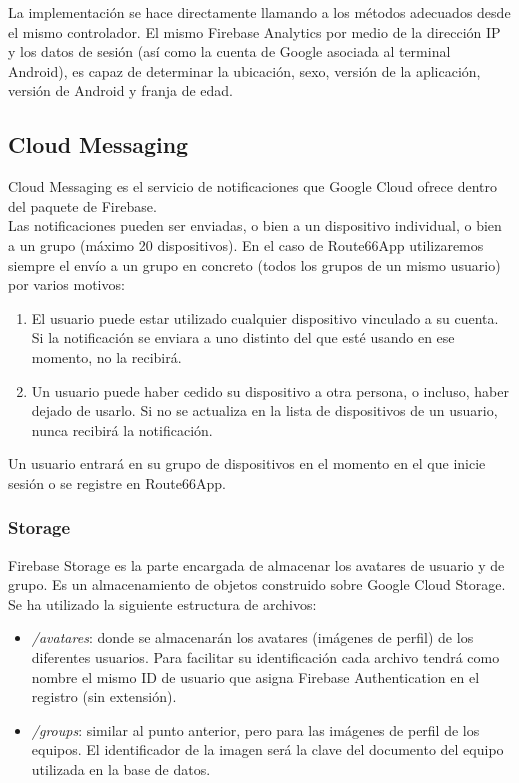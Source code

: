 \documentclass[twoside]{report}
\begin{document}
La implementación se hace directamente llamando a los métodos adecuados desde el mismo controlador. El mismo Firebase Analytics por medio de la dirección IP y los datos de sesión (así como la cuenta de Google asociada al terminal Android), es capaz de determinar la ubicación, sexo, versión de la aplicación, versión de Android y franja de edad.

\subsection{Cloud Messaging}

Cloud Messaging es el servicio de notificaciones que Google Cloud ofrece dentro del paquete de Firebase. \\

Las notificaciones pueden ser enviadas, o bien a un dispositivo individual, o bien a un grupo (máximo 20 dispositivos). En el caso de Route66App utilizaremos siempre el envío a un grupo en concreto (todos los grupos de un mismo usuario) por varios motivos:

\begin{enumerate}
\item El usuario puede estar utilizado cualquier dispositivo vinculado a su cuenta. Si la notificación se enviara a uno distinto del que esté usando en ese momento, no la recibirá.

\item Un usuario puede haber cedido su dispositivo a otra persona, o incluso, haber dejado de usarlo. Si no se actualiza en la lista de dispositivos de un usuario, nunca recibirá la notificación.
\end{enumerate}

Un usuario entrará en su grupo de dispositivos en el momento en el que inicie sesión o se registre en Route66App.


\subsubsection{Storage}

Firebase Storage es la parte encargada de almacenar los avatares de usuario y de grupo. Es un almacenamiento de objetos construido sobre Google Cloud Storage. \\

Se ha utilizado la siguiente estructura de archivos:
\begin{itemize}
\item \textit{/avatares}: donde se almacenarán los avatares (imágenes de perfil) de los diferentes usuarios. Para facilitar su identificación cada archivo tendrá como nombre el mismo ID de usuario que asigna Firebase Authentication en el registro (sin extensión). 
\item \textit{/groups}: similar al punto anterior, pero para las imágenes de perfil de los equipos. El identificador de la imagen será la clave del documento del equipo utilizada en la base de datos.
\end{itemize}
\end{document}
